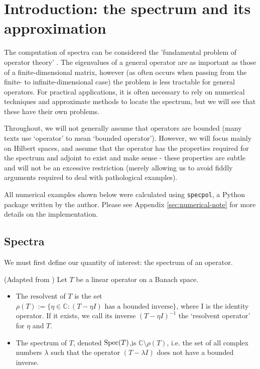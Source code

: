 \documentclass[../main.tex]{subfiles}
\begin{document}
\section{Introduction: the spectrum and its approximation}

The computation of spectra can be considered the 'fundamental problem of
operator theory' \cite{arveson2002short}. The eigenvalues of a general operator
are as important as those of a finite-dimensional matrix, 
however (as often occurs when passing from the finite- to infinite-dimensional
case) the problem is less tractable for general operators. For practical
applications, it is often necessary to rely on numerical techniques and
approximate methods to locate the spectrum, but we will see that these have
their own problems.

Throughout, we will not generally assume that operators are bounded
(many texts use `operator' to mean `bounded operator'). However, we will
focus mainly on Hilbert spaces, and assume that the operator has the properties
required for the spectrum and adjoint to exist and make sense - these properties
are subtle and will not be an excessive restriction (merely allowing us to avoid
fiddly arguments required to deal with pathological examples).

All numerical examples shown below were calculated using \texttt{specpol}, a
Python package written by the author. Please see Appendix
\ref{sec:numerical-note} for more details on the implementation.
\subsection{Spectra}

We must first define our quantity of interest: the spectrum of an operator.
\begin{definition}
  (Adapted from \parencite{edmunds2018spectral})
  Let $T$ be a linear operator on a Banach space.
  \begin{itemize}
  \item The resolvent of $T$ is the set 
    $\rho(T) := \{\eta \in \mathbb{C} : (T - \eta I)\text{ has a bounded inverse}\}$,
    where I is the identity
    operator. If it exists, we call its inverse $(T - \eta I)^{-1}$
    the `resolvent operator' for $\eta$ and $T$.
  \item The spectrum of $T$, denoted $\mathrm{Spec}(T)$,is
    $\mathbb{C} \setminus \rho(T)$, i.e. the set of all complex numbers $\lambda$
    such that the operator $(T - \lambda I)$ does not have a bounded inverse.
  \end{itemize}
\end{definition}
\end{document}
